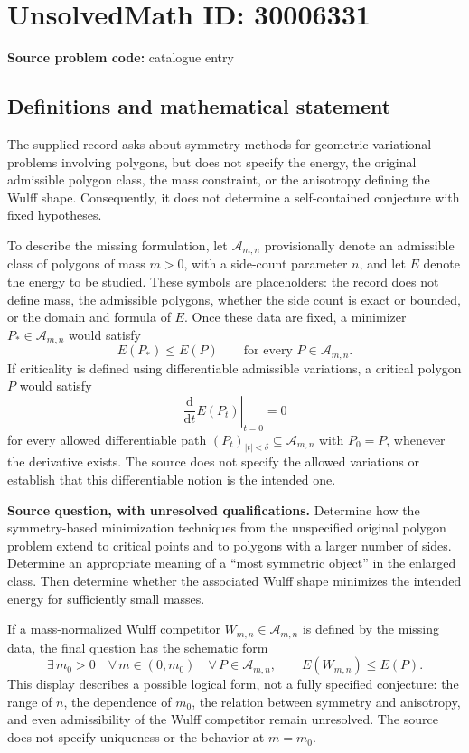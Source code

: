 \documentclass[11pt]{article}
\begin{document}
\section*{UnsolvedMath ID: 30006331}
\textbf{Source problem code:} catalogue entry
\subsection{Definitions and mathematical statement}
The supplied record asks about symmetry methods for geometric variational problems involving polygons, but does not specify the energy, the original admissible polygon class, the mass constraint, or the anisotropy defining the Wulff shape. Consequently, it does not determine a self-contained conjecture with fixed hypotheses.

To describe the missing formulation, let \(\mathcal A_{m,n}\) provisionally denote an admissible class of polygons of mass \(m>0\), with a side-count parameter \(n\), and let \(E\) denote the energy to be studied. These symbols are placeholders: the record does not define mass, the admissible polygons, whether the side count is exact or bounded, or the domain and formula of \(E\). Once these data are fixed, a minimizer \(P_*\in\mathcal A_{m,n}\) would satisfy
\[
E(P_*)\leq E(P)\qquad\text{for every }P\in\mathcal A_{m,n}.
\]
If criticality is defined using differentiable admissible variations, a critical polygon \(P\) would satisfy
\[
\left.\frac{\mathrm d}{\mathrm dt}E(P_t)\right|_{t=0}=0
\]
for every allowed differentiable path \((P_t)_{|t|<\delta}\subseteq\mathcal A_{m,n}\) with \(P_0=P\), whenever the derivative exists. The source does not specify the allowed variations or establish that this differentiable notion is the intended one.

\textbf{Source question, with unresolved qualifications.} Determine how the symmetry-based minimization techniques from the unspecified original polygon problem extend to critical points and to polygons with a larger number of sides. Determine an appropriate meaning of a ``most symmetric object'' in the enlarged class. Then determine whether the associated Wulff shape minimizes the intended energy for sufficiently small masses.

If a mass-normalized Wulff competitor \(W_{m,n}\in\mathcal A_{m,n}\) is defined by the missing data, the final question has the schematic form
\[
\exists\,m_0>0\quad\forall\,m\in(0,m_0)\quad
\forall\,P\in\mathcal A_{m,n},\qquad
E(W_{m,n})\leq E(P).
\]
This display describes a possible logical form, not a fully specified conjecture: the range of \(n\), the dependence of \(m_0\), the relation between symmetry and anisotropy, and even admissibility of the Wulff competitor remain unresolved. The source does not specify uniqueness or the behavior at \(m=m_0\).
\end{document}
